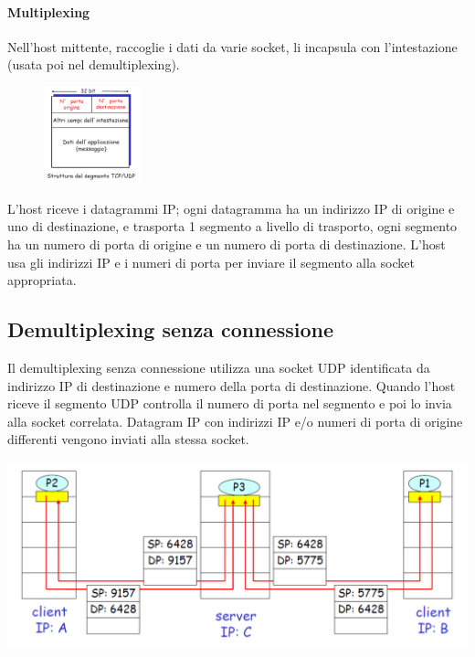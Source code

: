 \documentclass{report}
\begin{document}
	\paragraph{Multiplexing} Nell'host mittente, raccoglie i dati da varie socket, li incapsula con l'intestazione (usata poi nel demultiplexing).
	\medskip\\
	\begin{figure}
		\centering
		\vspace{-30pt}
		\includegraphics[width=0.25\textwidth]{segmento-trasporto}
	\end{figure}
	L’host riceve i datagrammi IP; ogni datagramma ha un indirizzo IP di origine e uno di destinazione, e trasporta 1 segmento a livello di trasporto, ogni segmento ha un numero di porta di origine e un numero di porta di destinazione. L’host usa gli indirizzi IP e i numeri di porta per inviare il segmento alla socket appropriata.
	
	\subsection{Demultiplexing senza connessione}
	Il demultiplexing senza connessione utilizza una socket UDP identificata da indirizzo IP di destinazione e numero della porta di destinazione. Quando l'host riceve il segmento UDP controlla il numero di porta nel segmento e poi lo invia alla socket correlata. Datagram IP con indirizzi IP e/o numeri di porta di origine differenti vengono inviati alla stessa socket.
	\begin{center}
		\includegraphics[width=0.7\linewidth]{socket-udp}
	\end{center}
\end{document}
